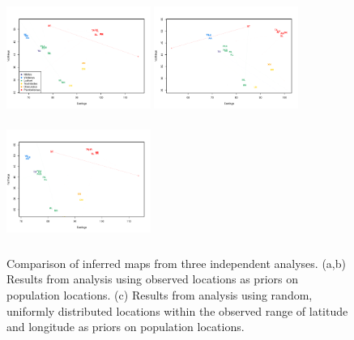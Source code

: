 \documentclass[12pt]{article}
\begin{document}
\begin{figure}
	\centering
		\subcaptionbox{\label{warb_pop_realpr1}}
			{\includegraphics[width=1.85in,height=1.54in]{figs/warblers/population_warbler_map_realpr1.pdf}}
		\subcaptionbox{\label{warb_pop_realpr2}}			
			{\includegraphics[width=1.85in,height=1.54in]{figs/warblers/population_warbler_map_realpr2.pdf}}
		\subcaptionbox{\label{warb_pop_randpr1}}
			{\includegraphics[width=1.85in,height=1.54in]{figs/warblers/population_warbler_map_randpr1.pdf}}
	\caption{Comparison of inferred maps from three independent analyses.  (a,b) Results from analysis using observed locations as priors on population locations.  (c) Results from analysis using random, uniformly distributed locations within the observed range of latitude and longitude as priors on population locations.}\label{sfig:warbler_pop_compare}
\end{figure}
\end{document}
